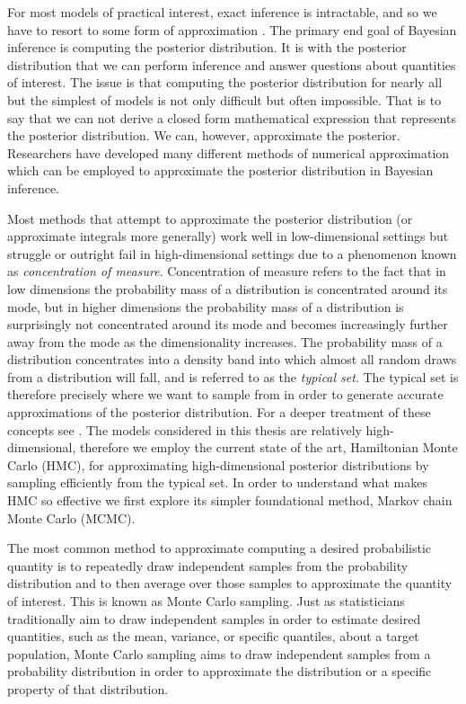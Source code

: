 For most models of practical interest, exact inference is intractable, and so we have to resort to some form of approximation \cite{Bishop2006}. The primary end goal of Bayesian inference is computing the posterior distribution. It is with the posterior distribution that we can perform inference and answer questions about quantities of interest. The issue is that computing the posterior distribution for nearly all but the simplest of models is not only difficult but often impossible. That is to say that we can not derive a closed form mathematical expression that represents the posterior distribution. We can, however, approximate the posterior. Researchers have developed many different methods of numerical approximation which can be employed to approximate the posterior distribution in Bayesian inference.

Most methods that attempt to approximate the posterior distribution (or approximate integrals more generally) work well in low-dimensional settings but struggle or outright fail in high-dimensional settings due to a phenomenon known as \textit{concentration of measure}. Concentration of measure refers to the fact that in low dimensions the probability mass of a distribution is concentrated around its mode, but in higher dimensions the probability mass of a distribution is surprisingly not concentrated around its mode and becomes increasingly further away from the mode as the dimensionality increases. The probability mass of a distribution concentrates into a density band into which almost all random draws from a distribution will fall, and is referred to as the \textit{typical set}. The typical set is therefore precisely where we want to sample from in order to generate accurate approximations of the posterior distribution. For a deeper treatment of these concepts see \cite{Betancourt2017} \cite{Carpenter2017}. The models considered in this thesis are relatively high-dimensional, therefore we employ the current state of the art, Hamiltonian Monte Carlo (HMC), for approximating high-dimensional posterior distributions by sampling efficiently from the typical set. In order to understand what makes HMC so effective we first explore its simpler foundational method, Markov chain Monte Carlo (MCMC).

The most common method to approximate computing a desired probabilistic quantity is to repeatedly draw independent samples from the probability distribution and to then average over those samples to approximate the quantity of interest. This is known as Monte Carlo sampling.  Just as statisticians traditionally aim to draw independent samples in order to estimate desired quantities, such as the mean, variance, or specific quantiles, about a target population, Monte Carlo sampling aims to draw independent samples from a probability distribution in order to approximate the distribution or a specific property of that distribution.

